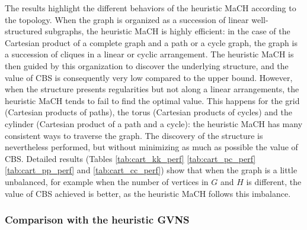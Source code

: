 \documentclass{scrartcl}
\theoremstyle{plain}
\newcommand{\algo}{MaCH}
\newcommand{\gvns}{GVNS}
\newcommand{\cbs}{CBS}
\begin{document}
The results highlight the different behaviors of the heuristic \algo{} according 
to the topology. When the graph is organized as a succession of linear 
well-structured subgraphs, the heuristic \algo{}  is highly efficient: in the 
case of the Cartesian product of a complete graph and a path or a cycle graph, 
the graph is a succession of cliques in a linear or cyclic arrangement. The 
heuristic \algo{} is then guided by this organization to discover the underlying 
structure, and the value of \cbs{} is consequently very low compared to the 
upper bound. However, when the structure presents regularities but not along a 
linear arrangements, the heuristic \algo{} tends to fail to find the optimal 
value. This happens for the grid (Cartesian products of paths), the torus 
(Cartesian products of cycles) and the cylinder (Cartesian product of a path and 
a cycle): the heuristic \algo{} has many consistent ways to traverse the graph. 
The discovery of the structure is nevertheless performed, but without minimizing 
as much as possible the value of \cbs{}. Detailed results (Tables 
\ref{tab:cart_kk_perf} \ref{tab:cart_pc_perf} \ref{tab:cart_pp_perf} and 
\ref{tab:cart_cc_perf}) show that when the graph is a little unbalanced, for 
example when the number of vertices in $G$ and $H$ is different, the value of 
\cbs{} achieved is better, as the heuristic \algo{} follows this imbalance.

\subsubsection{Comparison with the heuristic \gvns{}}
\end{document}
